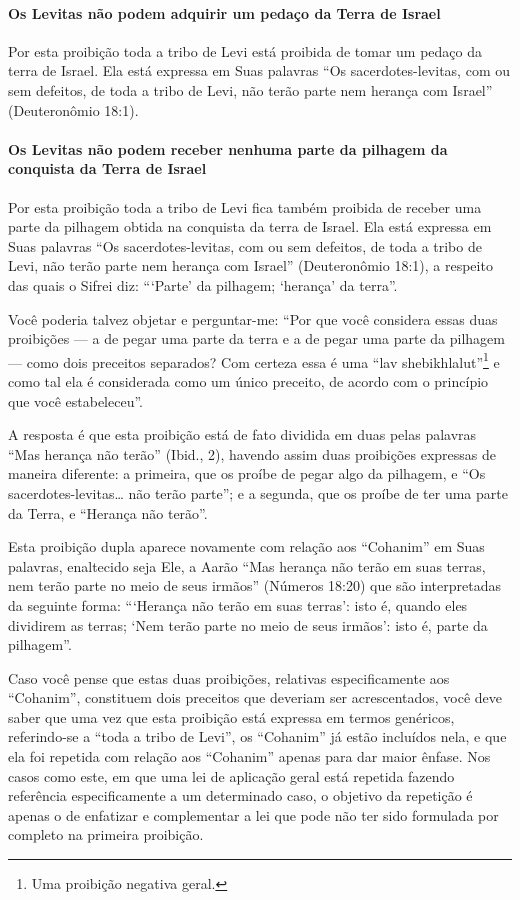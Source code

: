 \paragraph{Os Levitas não podem adquirir um pedaço da Terra de Israel}

Por esta proibição toda a tribo de Levi está proibida de tomar um pedaço
da terra de Israel. Ela está expressa em Suas palavras ``Os sacerdotes-levitas, com ou sem defeitos, de toda a tribo de Levi, não terão parte
nem herança com Israel'' (Deuteronômio 18:1).

\paragraph{Os Levitas não podem receber nenhuma parte da pilhagem da conquista
da Terra de Israel}

Por esta proibição toda a tribo de Levi fica também proibida de receber
uma parte da pilhagem obtida na conquista da terra de Israel. Ela está
expressa em Suas palavras ``Os sacerdotes-levitas, com ou sem defeitos,
de toda a tribo de Levi, não terão parte nem herança com Israel''
(Deuteronômio 18:1), a respeito das quais o Sifrei diz: ```Parte' da
pilhagem; `herança' da terra''.

Você poderia talvez objetar e perguntar-me: ``Por que você considera
essas duas proibições --- a de pegar uma parte da terra e a de pegar uma
parte da pilhagem --- como dois preceitos separados? Com certeza essa é
uma ``lav shebikhlalut''\footnote{Uma proibição negativa geral.} e como tal ela é
considerada como um único preceito, de acordo com o princípio que você
estabeleceu''.

A resposta é que esta proibição está de fato dividida em duas pelas
palavras ``Mas herança não terão'' (Ibid., 2), havendo assim duas
proibições expressas de maneira diferente: a primeira, que os proíbe de
pegar algo da pilhagem, e ``Os sacerdotes-levitas\ldots{} não terão parte'';
e a segunda, que os proíbe de ter uma parte da Terra, e ``Herança não
terão''.

Esta proibição dupla aparece novamente com relação aos ``Cohanim'' em
Suas palavras, enaltecido seja Ele, a Aarão ``Mas herança não terão em
suas terras, nem terão parte no meio de seus irmãos'' (Números 18:20)
que são interpretadas da seguinte forma: ```Herança não terão em suas
terras': isto é, quando eles dividirem as terras; `Nem terão parte no
meio de seus irmãos': isto é, parte da pilhagem''.

Caso você pense que estas duas proibições, relativas especificamente
aos ``Cohanim'', constituem dois preceitos que deveriam ser
acrescentados, você deve saber que uma vez que esta proibição está
expressa em termos genéricos, referindo-se a ``toda a tribo de Levi'',
os ``Cohanim'' já estão incluídos nela, e que ela foi repetida com
relação aos ``Cohanim'' apenas para dar maior ênfase. Nos casos como
este, em que uma lei de aplicação geral está repetida fazendo referência
especificamente a um determinado caso, o objetivo da repetição é apenas
o de enfatizar e complementar a lei que pode não ter sido formulada por
completo na primeira proibição.

